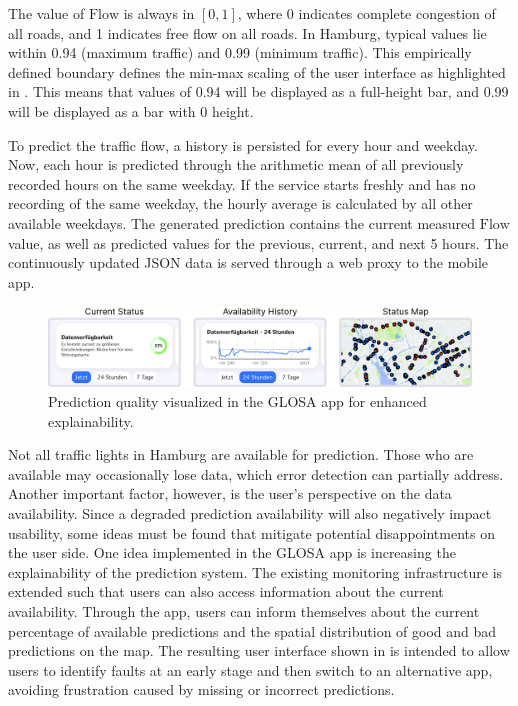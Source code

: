 The value of $\text{Flow}$ is always in $[0, 1]$, where 0 indicates complete congestion of all roads, and 1 indicates free flow on all roads. In Hamburg, typical values lie within 0.94 (maximum traffic) and 0.99 (minimum traffic). This empirically defined boundary defines the min-max scaling of the user interface as highlighted in . This means that values of 0.94 will be displayed as a full-height bar, and 0.99 will be displayed as a bar with 0 height. 

To predict the traffic flow, a history is persisted for every hour and weekday. Now, each hour is predicted through the arithmetic mean of all previously recorded hours on the same weekday. If the service starts freshly and has no recording of the same weekday, the hourly average is calculated by all other available weekdays. The generated prediction contains the current measured $\text{Flow}$ value, as well as predicted values for the previous, current, and next 5 hours. The continuously updated JSON data is served through a web proxy to the mobile app.


\begin{figure}[htbp]
\centering
\includegraphics[width=\linewidth]{images/home-view-prediction-quality.png}
\caption{Prediction quality visualized in the GLOSA app for enhanced explainability.}
\label{fig:home-view-prediction-quality}
\end{figure}

Not all traffic lights in Hamburg are available for prediction. Those who are available may occasionally lose data, which error detection can partially address. Another important factor, however, is the user's perspective on the data availability. Since a degraded prediction availability will also negatively impact usability, some ideas must be found that mitigate potential disappointments on the user side. One idea implemented in the GLOSA app is increasing the explainability of the prediction system. The existing monitoring infrastructure is extended such that users can also access information about the current availability. Through the app, users can inform themselves about the current percentage of available predictions and the spatial distribution of good and bad predictions on the map. The resulting user interface shown in  is intended to allow users to identify faults at an early stage and then switch to an alternative app, avoiding frustration caused by missing or incorrect predictions.

